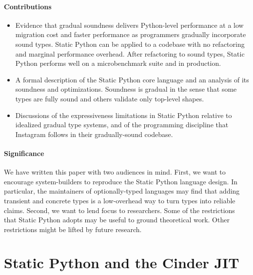 \documentclass[english,cleveref,submission]{programming}
\newcommand{\SP}{Static Python}
\begin{document}
\paragraph*{Contributions}

\begin{itemize}
  \item
    Evidence that gradual soundness delivers Python-level performance at a low migration cost
    and faster performance as programmers gradually incorporate sound types.
    \SP{} can be applied to a codebase with no refactoring and marginal performance overhead.
    After refactoring to sound types, \SP{} performs well on a microbenchmark
    suite and in production.
  \item
    A formal description of the \SP{} core language and an analysis of its soundness
    and optimizations.
    Soundness is gradual in the sense that some types are fully sound and others validate
    only top-level shapes.
  \item
    Discussions of the expressiveness limitations in \SP{} relative to
    idealized gradual type systems, and of the programming discipline that Instagram
    follows in their gradually-sound codebase.
\end{itemize}


\paragraph*{Significance}

We have written this paper with two audiences in mind.
First, we want to encourage system-builders to reproduce the
\SP{} language design.
In particular, the maintainers of optionally-typed languages
may find that adding transient and concrete types is a low-overhead
way to turn types into reliable claims.
Second, we want to lend focus to researchers.
Some of the restrictions that \SP{} adopts may be useful to
ground theoretical work.
Other restrictions might be lifted by future research.


\section{\SP{} and the Cinder JIT}
\label{s:tour}

\end{document}
